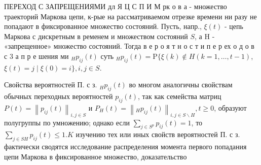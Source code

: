 \documentclass[10pt]{article}
\begin{document}
ПЕРЕХОД С ЗАПРЕЩЕНИЯМИ дл Я Ц С П И М рк о в а - множество траекторий Маркова цепи, к-рые на рассматриваемом отрезке времени ни разу не попадают в фиксированное множество состояний. Пусть, напр., $\xi(t)$ - цепь Маркова с дискретным в ременем и множеством состояний $S$, а $\mathrm{H}$ - «запрещенное» множество состояний. Тогда в е р о я т н о с т и п е р ех о д о в с 3 а п р е шения ми ${ }_{H} p_{i j}(t)$ суть ${ }_{H} p_{i j}(t)=\mathrm{P}\{\xi(k) \notin H(k=1, \ldots, t-1)$, $\xi(t)=j \mid \xi(0)=i\}, i, j \in S$.



Свойства вероятностей П. с з. ${ }_{H} p_{i j}(t)$ во многом аналогичны свойствам обычных переходных вероятностей $p_{i j}(t)$, так как семейства матриц $P(t)=\left\|p_{i j}(t)\right\|_{i, j \in S}$ и $P_{H}(t)=\left\|_{H} p_{i j}(t)\right\|_{i, j \in S \backslash H}, t \geqslant 0$, образуют полугруппы по умножению; однако если $\sum_{j \in S^{p}} p_{i j}(t)=1$, то $\sum_{j \in S H} p_{i j}(t) \leqslant 1 . K$ изучению тех или иных свойств вероятностей П. с з. фактически сводятся исследование распределения момента первого попадания цепи Маркова в фиксированное множество, доказательство
\end{document}
